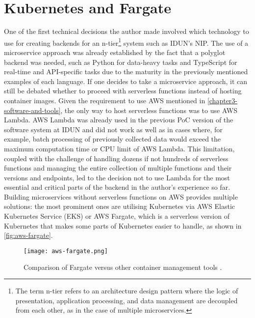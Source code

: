 \section*{Kubernetes and Fargate}
\label{chapter4-kubernetes-and-aws-fargate}

One of the first technical decisions the author made involved which technology to use for creating backends for an n-tier\footnote{The term n-tier refers to an architecture design pattern where the logic of presentation, application processing, and data management are decoupled from each other, as in the case of multiple microservices.} system such as IDUN’s NIP. The use of a microservice approach was already established by the fact that a polyglot backend was needed, such as Python for data-heavy tasks and TypeScript for real-time and API-specific tasks due to the maturity in the previously mentioned examples of each language. If one decides to take a microservice approach, it can still be debated whether to proceed with serverless functions instead of hosting container images. Given the requirement to use AWS mentioned in \autoref{chapter3-software-and-tools}, the only way to host serverless functions was to use AWS Lambda. AWS Lambda was already used in the previous PoC version of the software system at IDUN and did not work as well as in cases where, for example, batch processing of previously collected data would exceed the maximum computation time or CPU limit of AWS Lambda. This limitation, coupled with the challenge of handling dozens if not hundreds of serverless functions and managing the entire collection of multiple functions and their versions and endpoints, led to the decision not to use Lambda for the most essential and critical parts of the backend in the author’s experience so far. Building microservices without serverless functions on AWS provides multiple solutions: the most prominent ones are utilising Kubernetes via AWS Elastic Kubernetes Service (EKS) or AWS Fargate, which is a serverless version of Kubernetes \citep{amazon_web_services_inc_serverless_nodate} that makes some parts of Kubernetes easier to handle, as shown in \autoref{fig:aws-fargate}.

\begin{figure}[!ht]
  \centering
  \texttt{[image: aws-fargate.png]}
  \caption[Comparison of Fargate versus other container management tools]{Comparison of Fargate versus other container management tools \citep{amazon_web_services_inc_serverless_nodate}.}
  \label{fig:aws-fargate}
\end{figure}

